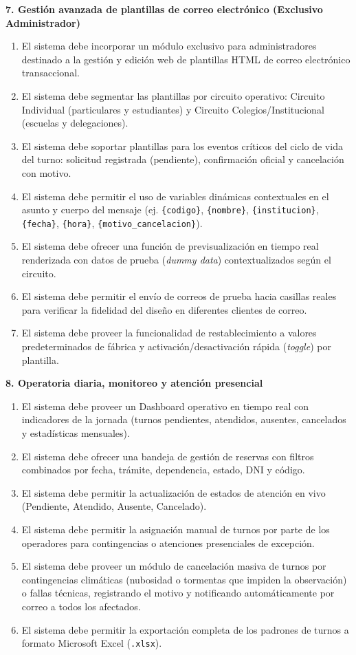 \textbf{7. Gestión avanzada de plantillas de correo electrónico (Exclusivo Administrador)}
\begin{enumerate}[resume]
    \item El sistema debe incorporar un módulo exclusivo para administradores destinado a la gestión y edición web de plantillas HTML de correo electrónico transaccional.
    \item El sistema debe segmentar las plantillas por circuito operativo: Circuito Individual (particulares y estudiantes) y Circuito Colegios/Institucional (escuelas y delegaciones).
    \item El sistema debe soportar plantillas para los eventos críticos del ciclo de vida del turno: solicitud registrada (pendiente), confirmación oficial y cancelación con motivo.
    \item El sistema debe permitir el uso de variables dinámicas contextuales en el asunto y cuerpo del mensaje (ej. \texttt{\{codigo\}}, \texttt{\{nombre\}}, \texttt{\{institucion\}}, \texttt{\{fecha\}}, \texttt{\{hora\}}, \texttt{\{motivo\_cancelacion\}}).
    \item El sistema debe ofrecer una función de previsualización en tiempo real renderizada con datos de prueba (\textit{dummy data}) contextualizados según el circuito.
    \item El sistema debe permitir el envío de correos de prueba hacia casillas reales para verificar la fidelidad del diseño en diferentes clientes de correo.
    \item El sistema debe proveer la funcionalidad de restablecimiento a valores predeterminados de fábrica y activación/desactivación rápida (\textit{toggle}) por plantilla.
\end{enumerate}

\textbf{8. Operatoria diaria, monitoreo y atención presencial}
\begin{enumerate}[resume]
    \item El sistema debe proveer un Dashboard operativo en tiempo real con indicadores de la jornada (turnos pendientes, atendidos, ausentes, cancelados y estadísticas mensuales).
    \item El sistema debe ofrecer una bandeja de gestión de reservas con filtros combinados por fecha, trámite, dependencia, estado, DNI y código.
    \item El sistema debe permitir la actualización de estados de atención en vivo (Pendiente, Atendido, Ausente, Cancelado).
    \item El sistema debe permitir la asignación manual de turnos por parte de los operadores para contingencias o atenciones presenciales de excepción.
    \item El sistema debe proveer un módulo de cancelación masiva de turnos por contingencias climáticas (nubosidad o tormentas que impiden la observación) o fallas técnicas, registrando el motivo y notificando automáticamente por correo a todos los afectados.
    \item El sistema debe permitir la exportación completa de los padrones de turnos a formato Microsoft Excel (\texttt{.xlsx}).
\end{enumerate}

